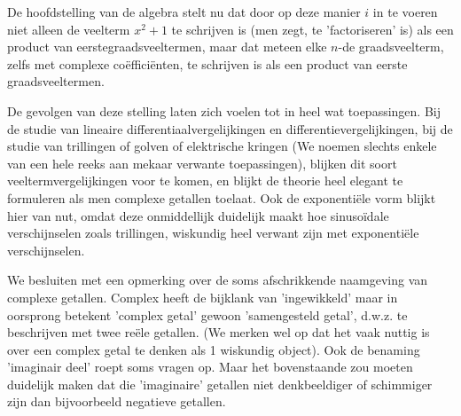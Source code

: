 \documentclass{ximera}
\begin{document}
De hoofdstelling van de algebra stelt nu dat door op deze manier $i$ in
te voeren niet alleen de veelterm $x^2+1$ te schrijven is (men zegt, te
'factoriseren' is) als een product van eerstegraadsveeltermen, maar dat
meteen elke $n$-de graadsveelterm, zelfs met complexe co\"effici\"enten, te
schrijven is als een product van eerste graadsveeltermen. 

De gevolgen van deze stelling laten zich voelen tot in heel wat
toepassingen. Bij de studie van lineaire differentiaalvergelijkingen
en differentievergelijkingen, bij de studie van trillingen of golven
of elektrische kringen (We noemen slechts enkele van een hele reeks
aan mekaar verwante toepassingen), blijken dit soort
veeltermvergelijkingen voor te komen, en blijkt de theorie heel
elegant te formuleren als men complexe getallen toelaat. Ook de
exponenti\"ele vorm blijkt hier van nut, omdat deze onmiddellijk duidelijk
maakt hoe sinuso\"idale verschijnselen zoals trillingen, wiskundig heel
verwant zijn met exponenti\"ele verschijnselen.

We besluiten met een opmerking over de soms afschrikkende naamgeving
van complexe getallen. Complex heeft de bijklank van 'ingewikkeld'
maar in oorsprong betekent 'complex getal' gewoon 'samengesteld
getal', d.w.z. te beschrijven met twee re\"ele getallen. (We merken
wel op dat het vaak nuttig is over een complex getal te denken als 1
wiskundig object). Ook de benaming 'imaginair deel' roept soms
vragen op. Maar het bovenstaande zou moeten duidelijk maken dat die
'imaginaire' getallen niet denkbeeldiger of schimmiger zijn dan
bijvoorbeeld negatieve getallen.
\end{document}
